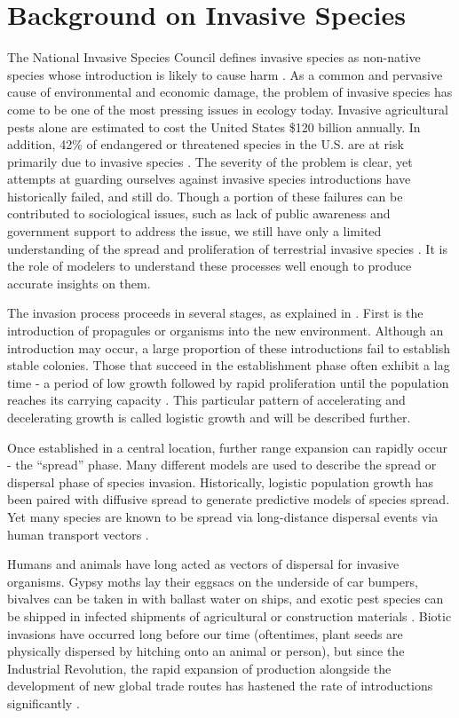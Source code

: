 \documentclass[12pt, openany]{book}
\theoremstyle{definition}
\theoremstyle{remark}
\numberwithin{equation}{chapter}
\numberwithin{figure}{chapter}
\begin{document}
\section{Background on Invasive Species}

The National Invasive Species Council defines invasive species as non-native species whose introduction is likely to cause harm \citep{invasive2006invasive}. As a common and pervasive cause of environmental and economic damage, the problem of invasive species has come to be one of the most pressing issues in ecology today. Invasive agricultural pests alone are estimated to cost the United States \$120 billion annually. In addition, 42\% of endangered or threatened species in the U.S. are at risk primarily due to invasive species \citep{pimentel2005update}. The severity of the problem is clear, yet attempts at guarding ourselves against invasive species introductions have historically failed, and still do. Though a portion of these failures can be contributed to sociological issues, such as lack of public awareness and government support to address the issue, we still have only a limited understanding of the spread and proliferation of terrestrial invasive species \citep{mack2000biotic}. It is the role of modelers to understand these processes well enough to produce accurate insights on them. 

The invasion process proceeds in several stages, as explained in \cite{williamson1989mathematical}. First is the introduction of propagules or organisms into the new environment. Although an introduction may occur, a large proportion of these introductions fail to establish stable colonies. Those that succeed in the establishment phase often exhibit a lag time - a period of low growth followed by rapid proliferation until the population reaches its carrying capacity \citep{mack2000biotic}. This particular pattern of accelerating and decelerating growth is called logistic growth and will be described further.
	
Once established in a central location, further range expansion can rapidly occur - the ``spread'' phase. Many different models are used to describe the spread or dispersal phase of species invasion. Historically, logistic population growth has been paired with diffusive spread to generate predictive models of species spread. Yet many species are known to be spread via long-distance dispersal events via human transport vectors \citep{carlton2003invasive}. 

Humans and animals have long acted as vectors of dispersal for invasive organisms. Gypsy moths lay their eggsacs on the underside of car bumpers, bivalves can be taken in with ballast water on ships, and exotic pest species can be shipped in infected shipments of agricultural or construction materials \citep{carlton2003invasive}. Biotic invasions have occurred long before our time (oftentimes, plant seeds are physically dispersed by hitching onto an animal or person), but since the Industrial Revolution, the rapid expansion of production alongside the development of new global trade routes has hastened the rate of introductions significantly \citep{hulme2009trade}.
\end{document}
